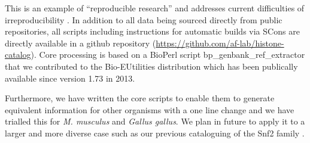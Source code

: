 	This is an example of ``reproducible research'' \citep{reproducible-research-bioinformatics, reproducible-research-law}
	and addresses current difficulties of irreproducibility .
	In addition to all data being sourced directly from public repositories, 
	all scripts including instructions for automatic builds via SCons \citep{SCons2005}
	are directly available in a github repository (\url{https://github.com/af-lab/histone-catalog}).
	Core processing is based on a BioPerl script bp\_genbank\_ref\_extractor
	that we contributed to the Bio-EUtilities distribution 
	which has been publically available since version 1.73 in 2013.

	Furthermore, we have written the core scripts to enable them to generate 
	equivalent information for other organisms with a one line change 
	and we have trialled this for \textit{M. musculus} and \textit{Gallus gallus}.
	We plan in future to apply it to a larger and more diverse case such as
	our previous cataloguing of the Snf2 family \citep{andrew-snf2-catalogue}.

